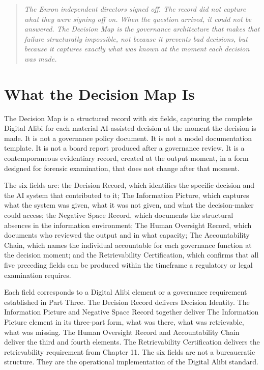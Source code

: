 \begin{quote}
\emph{The Enron independent directors signed off. The record did not capture what they were signing off on. When the question arrived, it could not be answered. The Decision Map is the governance architecture that makes that failure structurally impossible, not because it prevents bad decisions, but because it captures exactly what was known at the moment each decision was made.}
\end{quote}

\scenebreak

\section{What the Decision Map Is}

The Decision Map is a structured record with six fields, capturing the complete Digital Alibi for each material AI-assisted decision at the moment the decision is made. It is not a governance policy document. It is not a model documentation template. It is not a board report produced after a governance review. It is a contemporaneous evidentiary record, created at the output moment, in a form designed for forensic examination, that does not change after that moment.

The six fields are: the Decision Record, which identifies the specific decision and the AI system that contributed to it; The Information Picture, which captures what the system was given, what it was not given, and what the decision-maker could access; the Negative Space Record, which documents the structural absences in the information environment; The Human Oversight Record, which documents who reviewed the output and in what capacity; The Accountability Chain, which names the individual accountable for each governance function at the decision moment; and the Retrievability Certification, which confirms that all five preceding fields can be produced within the timeframe a regulatory or legal examination requires.

Each field corresponds to a Digital Alibi element or a governance requirement established in Part Three. The Decision Record delivers Decision Identity. The Information Picture and Negative Space Record together deliver The Information Picture element in its three-part form, what was there, what was retrievable, what was missing. The Human Oversight Record and Accountability Chain deliver the third and fourth elements. The Retrievability Certification delivers the retrievability requirement from Chapter 11. The six fields are not a bureaucratic structure. They are the operational implementation of the Digital Alibi standard.

